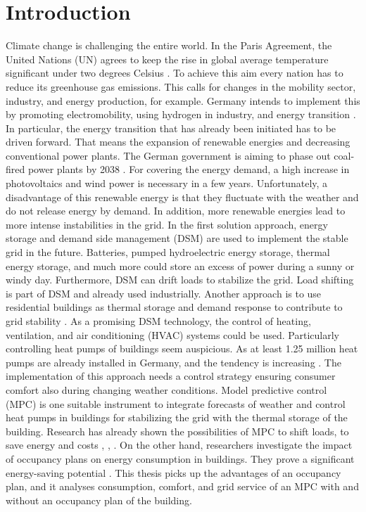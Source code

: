 \chapter{Introduction}
\label{ch:introduction}
Climate change is challenging the entire world. In the Paris Agreement, the United Nations (UN)  agrees to keep the rise in global average temperature significant under two degrees Celsius \cite{UnitedNations.2015}. To achieve this aim every nation has to reduce its greenhouse gas emissions. This calls for changes in the mobility sector, industry, and energy production, for example. Germany intends to implement this by promoting electromobility, using hydrogen in industry, and energy transition \cite{Deutschlandfunk.24.06.2021}. In particular, the energy transition that has already been initiated has to be driven forward. That means the expansion of renewable energies and decreasing conventional power plants. The German government is aiming to phase out coal-fired power plants by 2038 \cite{bundesregierung.2021}. For covering the energy demand, a high increase in photovoltaics and wind power is necessary in a few years. 
\newline
Unfortunately, a disadvantage of this renewable energy is that they fluctuate with the weather and do not release energy by demand. In addition, more renewable energies lead to more intense instabilities in the grid. In the first solution approach, energy storage and demand side management (DSM)  are used to implement the stable grid in the future. Batteries, pumped hydroelectric energy storage, thermal energy storage, and much more could store an excess of power during a sunny or windy day. Furthermore, DSM can drift loads to stabilize the grid. Load shifting is part of DSM \cite{Gellings.1985} and already used industrially. Another approach is to use residential buildings as thermal storage and demand response to contribute to grid stability \cite{Kohlhepp.2017}. As a promising DSM technology, the control of heating, ventilation, and air conditioning (HVAC) systems could be used. Particularly controlling heat pumps of buildings seem auspicious. As at least 1.25 million heat pumps are already installed in Germany, and the tendency is increasing \cite{BMW.2021}.
\newline
The implementation of this approach needs a control strategy ensuring consumer comfort also during changing weather conditions. Model predictive control (MPC)  is one suitable instrument to integrate forecasts of weather and control heat pumps in buildings for stabilizing the grid with the thermal storage of the building. Research has already shown the possibilities of MPC to shift loads, to save energy and costs \cite{Oldewurtel.2010}, \cite{Hazyuk.2012b}, \cite{Zwickel.2019}.
On the other hand, researchers investigate the impact of occupancy plans on energy consumption in buildings. They prove a significant energy-saving potential \cite{Wang.2019}. This thesis picks up the advantages of an occupancy plan, and it analyses consumption, comfort, and grid service of an MPC with and without an occupancy plan of the building.
 

